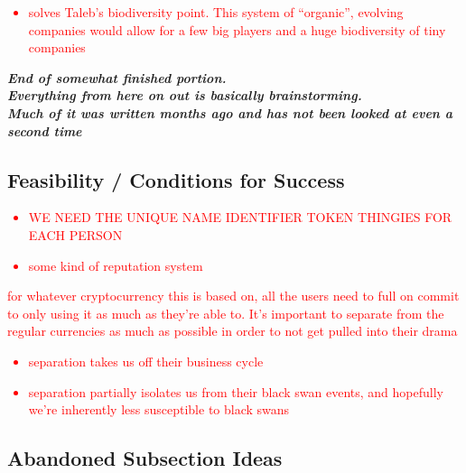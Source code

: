 \documentclass{article}[10pt]
\begin{document}
\textcolor{red}{\begin{itemize}
    \item solves Taleb’s biodiversity point. This system of “organic”, evolving companies would allow for a few big players and a huge biodiversity of tiny companies
\end{itemize}}





\vspace{1in}
\begin{center}
\color{red}
\textbf{\textit{End of somewhat finished portion.}}\\
\textbf{\textit{Everything from here on out is basically brainstorming.}}\\
\textbf{\textit{Much of it was written months ago and has not been looked at even a second time}}
\end{center}

\subsection{Feasibility / Conditions for Success}
\label{subection:Feasibility}

\textcolor{red}{\begin{itemize}
    \item WE NEED THE UNIQUE NAME IDENTIFIER TOKEN THINGIES FOR EACH PERSON
    \item some kind of reputation system
\end{itemize}}

\textcolor{red}{for whatever cryptocurrency this is based on, all the users need to full on commit to only using it as much as they’re able to. 
It’s important to separate from the regular currencies as much as possible in order to not get pulled into their drama}
\textcolor{red}{\begin{itemize}
    \item separation takes us off their business cycle
    \item separation partially isolates us from their black swan events, and hopefully we're inherently less susceptible to black swans
\end{itemize}}






\subsection{Abandoned Subsection Ideas}
\end{document}
